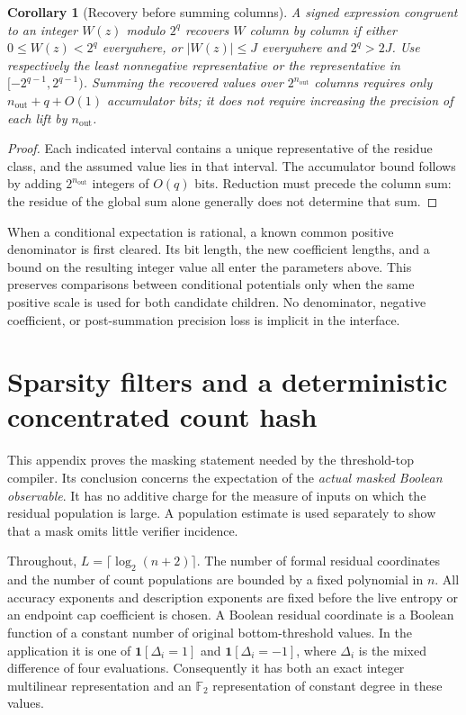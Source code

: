\documentclass[11pt,letterpaper]{article}
\newtheorem{corollary}[theorem]{Corollary}
\theoremstyle{definition}
\theoremstyle{remark}
\begin{document}
\begin{corollary}[Recovery before summing columns]
\label{alg:recovery}
A signed expression congruent to an integer $W(z)$ modulo $2^q$ recovers
$W$ column by column if either $0\le W(z)<2^q$ everywhere, or
$|W(z)|\le J$ everywhere and $2^q>2J$.  Use respectively the least
nonnegative representative or the representative in
$[-2^{q-1},2^{q-1})$.  Summing the recovered values over $2^{n_{\mathrm{out}}}$ columns
requires only $n_{\mathrm{out}}+q+O(1)$ accumulator bits; it does not require increasing
the precision of each lift by $n_{\mathrm{out}}$.
\end{corollary}

\begin{proof}
Each indicated interval contains a unique representative of the residue
class, and the assumed value lies in that interval.  The accumulator
bound follows by adding $2^{n_{\mathrm{out}}}$ integers of $O(q)$ bits.  Reduction must
precede the column sum: the residue of the global sum alone generally
does not determine that sum.
\end{proof}

When a conditional expectation is rational, a known common positive
denominator is first cleared.  Its bit length, the new coefficient
lengths, and a bound on the resulting integer value all enter the
parameters above.  This preserves comparisons between conditional
potentials only when the same positive scale is used for both candidate
children.  No denominator, negative coefficient, or post-summation
precision loss is implicit in the interface.


\section{Sparsity filters and a deterministic concentrated count hash}
\label{filt:appendix}

This appendix proves the masking statement needed by the threshold-top
compiler.  Its conclusion concerns the expectation of the \emph{actual
masked Boolean observable}.  It has no additive charge for the measure of
inputs on which the residual population is large.  A population estimate
is used separately to show that a mask omits little verifier incidence.

Throughout, $L=\lceil\log_2(n+2)\rceil$.  The number of formal residual
coordinates and the number of count populations are bounded by a fixed
polynomial in $n$.  All accuracy exponents and description exponents are
fixed before the live entropy or an endpoint cap coefficient is chosen.
A Boolean residual coordinate is a Boolean function of a constant number
of original bottom-threshold values.  In the application it is one of
$\mathbf1[\Delta_i=1]$ and $\mathbf1[\Delta_i=-1]$, where $\Delta_i$ is the
mixed difference of four evaluations.  Consequently it has both an exact
integer multilinear representation and an $\mathbb F_2$ representation of
constant degree in these values.
\end{document}
